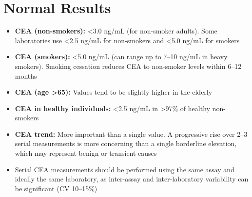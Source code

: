 \section*{Normal Results}
\begin{itemize}
  \item \textbf{CEA (non-smokers):} <3.0 ng/mL (for non-smoker adults). Some laboratories use <2.5 ng/mL for non-smokers and <5.0 ng/mL for smokers
  \item \textbf{CEA (smokers):} <5.0 ng/mL (can range up to 7--10 ng/mL in heavy smokers). Smoking cessation reduces CEA to non-smoker levels within 6--12 months
  \item \textbf{CEA (age >65):} Values tend to be slightly higher in the elderly
  \item \textbf{CEA in healthy individuals:} <2.5 ng/mL in >97\% of healthy non-smokers
  \item \textbf{CEA trend:} More important than a single value. A progressive rise over 2--3 serial measurements is more concerning than a single borderline elevation, which may represent benign or transient causes
  \item Serial CEA measurements should be performed using the same assay and ideally the same laboratory, as inter-assay and inter-laboratory variability can be significant (CV 10--15\%)
\end{itemize}

